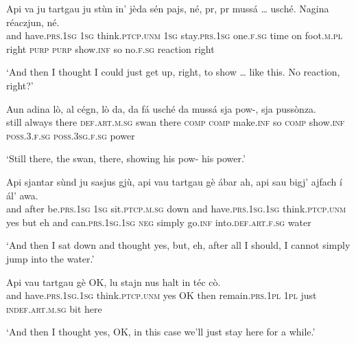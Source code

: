 \begin{linenumbers}
\gll  Api va ju tartgau ju stùn in’ jèda sén pajs, né, pr, pr mussá … usché.\footnotemark{}  Nagina réaczjun, né.\\
and have.\textsc{prs.1sg} \textsc{1sg} think.\textsc{ptcp.unm} \textsc{1sg} stay.\textsc{prs.1sg} one.\textsc{f.sg} time on foot.\textsc{m.pl} right \textsc{purp} \textsc{purp} show.\textsc{inf} {} so no.\textsc{f.sg} reaction right\\
\end{linenumbers}\medskip
\glt `And then I thought I could just get up, right, to show … like this. No reaction, right?'
\medskip

\begin{linenumbers}
\gll  Aun adina lò, al cégn, lò da, da fá usché da mussá sja pow-, sja pussònza.\\
still always there \textsc{def.art.m.sg} swan there \textsc{comp} \textsc{comp} make.\textsc{inf} so \textsc{comp} show.\textsc{inf} \textsc{poss.3.f.sg} {} \textsc{poss.3sg.f.sg} power\\
\end{linenumbers}
\medskip
\glt `Still there, the swan, there, showing his pow- his power.'
\medskip

\begin{linenumbers}
\gll  Api sjantar sùnd ju sasjus gjù, api vau tartgau gè ábar ah, api sau bigj’ ajfach\footnotemark{} í ál’ awa.\\
and after be.\textsc{prs.1sg} \textsc{1sg} sit.\textsc{ptcp.m.sg} down and have.\textsc{prs.1sg.1sg} think.\textsc{ptcp.unm} yes but eh and can.\textsc{prs.1sg.1sg} \textsc{neg} simply go.\textsc{inf} into.\textsc{def.art.f.sg} water\\
\end{linenumbers}
\medskip
\glt `And then I sat down and thought yes, but, eh, after all I should, I cannot simply jump into the water.'
\medskip

\begin{linenumbers}
\gll  Api vau tartgau gè OK, lu stajn nus halt in téc cò.\\
and have.\textsc{prs.1sg.1sg} think.\textsc{ptcp.unm} yes OK then remain.\textsc{prs.1pl} \textsc{1pl} just \textsc{indef.art.m.sg} bit here\\
\end{linenumbers}
\medskip
\glt `And then I thought yes, OK, in this case we’ll just stay here for a while.'
\medskip


